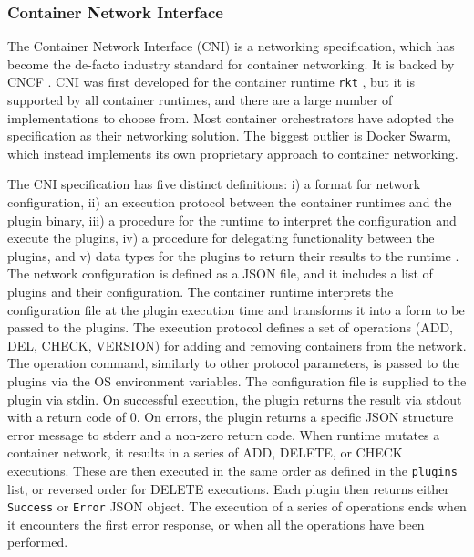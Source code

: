 \documentclass[english, 12pt, a4paper, sci, utf8, a-2b, online]{aaltothesis}
\begin{document}
\subsubsection{Container Network Interface} \label{cni}

The Container Network Interface (CNI) \cite{cni} is a networking specification, which has become the de-facto industry standard for container networking.
It is backed by CNCF \cite{qi2020assessing}.
CNI was first developed for the container runtime \texttt{rkt} \cite{hausenblas2018container}, but it is supported by all container runtimes, and there are a large number of implementations to choose from.
Most container orchestrators have adopted the specification as their networking solution.
The biggest outlier is Docker Swarm, which instead implements its own proprietary approach to container networking.

The CNI specification has five distinct definitions: i) a format for network configuration, ii) an execution protocol between the container runtimes and the plugin binary, iii) a procedure for the runtime to interpret the configuration and execute the plugins, iv) a procedure for delegating functionality between the plugins, and v) data types for the plugins to return their results to the runtime \cite{cni}.
The network configuration is defined as a JSON file, and it includes a list of plugins and their configuration.
The container runtime interprets the configuration file at the plugin execution time and transforms it into a form to be passed to the plugins.
The execution protocol defines a set of operations (ADD, DEL, CHECK, VERSION) for adding and removing containers from the network.
The operation command, similarly to other protocol parameters, is passed to the plugins via the OS environment variables.
The configuration file is supplied to the plugin via stdin.
On successful execution, the plugin returns the result via stdout with a return code of 0.
On errors, the plugin returns a specific JSON structure error message to stderr and a non-zero return code.
When runtime mutates a container network, it results in a series of ADD, DELETE, or CHECK executions.
These are then executed in the same order as defined in the \texttt{plugins} list, or reversed order for DELETE executions.
Each plugin then returns either \texttt{Success} or \texttt{Error} JSON object.
The execution of a series of operations ends when it encounters the first error response, or when all the operations have been performed.

\end{document}
